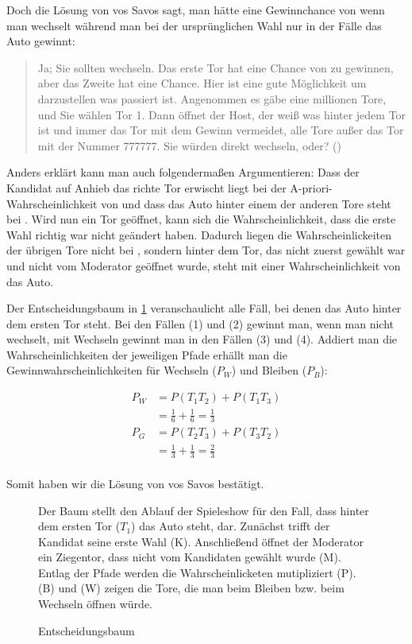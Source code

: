 Doch die Lösung von vos Savos sagt, man hätte eine Gewinnchance von  wenn man wechselt während man bei der ursprünglichen Wahl nur in  der Fälle das Auto gewinnt:

\begin{quote}
    Ja; Sie sollten wechseln. Das erste Tor hat eine Chance von  zu gewinnen, aber das Zweite hat eine  Chance. Hier ist eine gute Möglichkeit um darzustellen was passiert ist. Angenommen es gäbe eine millionen Tore, und Sie wählen Tor 1. Dann öffnet der Host, der weiß was hinter jedem Tor ist und immer das Tor mit dem Gewinn vermeidet, alle Tore außer das Tor mit der Nummer 777777. Sie würden direkt wechseln, oder? (\cite{Savant:1990})
\end{quote}

Anders erklärt kann man auch folgendermaßen Argumentieren: Dass der Kandidat auf Anhieb das richte Tor erwischt liegt bei der A-priori-Wahrscheinlichkeit von  und dass das Auto hinter einem der anderen Tore steht bei . Wird nun ein Tor geöffnet, kann sich die Wahrscheinlichkeit, dass die erste Wahl richtig war nicht geändert haben. Dadurch liegen die Wahrscheinlickeiten der übrigen Tore nicht bei , sondern hinter dem Tor, das nicht zuerst gewählt war und nicht vom Moderator geöffnet wurde, steht mit einer Wahrscheinlichkeit von  das Auto.

Der Entscheidungsbaum in \ref{fig:tree} veranschaulicht alle Fäll, bei denen das Auto hinter dem ersten Tor steht. Bei den Fällen (1) und (2) gewinnt man, wenn man nicht wechselt, mit Wechseln gewinnt man in den Fällen (3) und (4). Addiert man die Wahrscheinlichkeiten der jeweiligen Pfade erhällt man die Gewinnwahrscheinlichkeiten für Wechseln ($P_W$) und Bleiben ($P_B$):

\begin{equation}
    \begin{split}
        P_W & = P(T_1T_2) + P(T_1T_3) \\
        & = \frac{1}{6} + \frac{1}{6} = \frac{1}{3} \\
        P_G & = P(T_2T_3) + P(T_3T_2) \\
        &= \frac{1}{3} + \frac{1}{3} = \frac{2}{3} \\
    \end{split}
\end{equation}

Somit haben wir die Lösung von vos Savos bestätigt.

\begin{figure}[htbp]
    \centering
    \caption{Entscheidungsbaum}\label{fig:tree}
    \small {Der Baum stellt den Ablauf der Spieleshow für den Fall, dass hinter dem ersten Tor ($T_1$) das Auto steht, dar. Zunächst trifft der Kandidat seine erste Wahl (K). Anschließend öffnet der Moderator ein Ziegentor, dass nicht vom Kandidaten gewählt wurde (M). Entlag der Pfade werden die Wahrscheinlicketen mutipliziert (P). (B) und (W) zeigen die Tore, die man beim Bleiben bzw. beim Wechseln öffnen würde.}
\end{figure}
